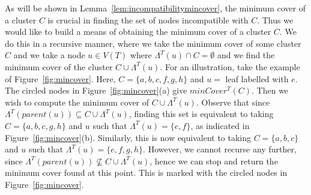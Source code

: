 \documentclass{article}
\newcommand{\leafset}{\Lambda}
\begin{document}
    As will be shown in Lemma~\ref{lem:incompatibilitymincover}, the minimum cover of a cluster $C$ is crucial in finding the set of nodes incompatible with $C$. Thus we would like to build a means of obtaining the minimum cover of a cluster $C$. We do this in a recursive manner, where we take the minimum cover of some cluster $C$ and we take a node $u \in V(T)$ where $\leafset^{T}(u) \cap C = \emptyset$ and we find the minimum cover of the cluster $C \cup \leafset^{T}(u)$. For an illustration, take the example of Figure~\ref{fig:mincover}. Here, $C = \{a, b, c, f, g, h\}$ and $u =$ leaf labelled with $e$. The circled nodes in Figure~\ref{fig:mincover}(a) give $minCover^{T}(C)$. Then we wish to compute the minimum cover of $C \cup \leafset^{T}(u)$. Observe that since $\leafset^{T}(parent(u)) \subseteq C \cup \leafset^{T}(u)$, finding this set is equivalent to taking $C = \{a, b, c, g, h\}$ and $u$ such that $\leafset^{T}(u) = \{e, f\}$, as indicated in Figure~\ref{fig:mincover}(b). Similarly, this is now equivalent to taking $C = \{a, b, c\}$ and $u$ such that $\leafset^{T}(u) = \{e, f, g, h\}$. However, we cannot recurse any further, since $\leafset^{T}(parent(u)) \not\subseteq C \cup \leafset^{T}(u)$, hence we can stop and return the minimum cover found at this point. This is marked with the circled nodes in Figure~\ref{fig:mincover}.
    \newline
\end{document}
